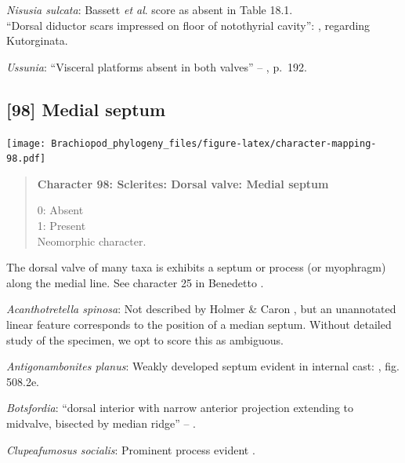 \documentclass[openany]{book}
\begin{document}
\hypertarget{Nisusia_sulcata-coding-97}{}
\emph{Nisusia sulcata}: Bassett \emph{et al}.
\citeyearpar{Bassett2001Functionalmorphology} score as absent in Table
18.1.\\
``Dorsal diductor scars impressed on floor of notothyrial cavity'':
\citet{Williams2000LinguliformeaCraniiformea}, regarding Kutorginata.

\hypertarget{Ussunia-coding-97}{}
\emph{Ussunia}: ``Visceral platforms absent in both valves'' --
\citet{Williams2000LinguliformeaCraniiformea}, p.~192.

\subsection*{{[}98{]} Medial septum}\label{medial-septum}

\texttt{[image: Brachiopod\_phylogeny\_files/figure-latex/character-mapping-98.pdf]}

\begin{quote}
\textbf{Character 98: Sclerites: Dorsal valve: Medial septum}

0: Absent\\
1: Present\\
Neomorphic character.
\end{quote}

The dorsal valve of many taxa is exhibits a septum or process (or
myophragm) along the medial line. See character 25 in Benedetto
\citeyearpar{Benedetto2009iChaniella}.

\hypertarget{Acanthotretella_spinosa-coding-98}{}
\emph{Acanthotretella spinosa}: Not described by Holmer \& Caron
\citeyearpar{Holmer2006Aspinose}, but an unannotated linear feature
corresponds to the position of a median septum. Without detailed study
of the specimen, we opt to score this as ambiguous.

\hypertarget{Antigonambonites_planus-coding-98}{}
\emph{Antigonambonites planus}: Weakly developed septum evident in
internal cast: \citet{Williams2000LinguliformeaCraniiformea}, fig.
508.2e.

\hypertarget{Botsfordia-coding-98}{}
\emph{Botsfordia}: ``dorsal interior with narrow anterior projection
extending to midvalve, bisected by median ridge'' --
\citet{Williams2000LinguliformeaCraniiformea}.

\hypertarget{Clupeafumosus_socialis-coding-98}{}
\emph{Clupeafumosus socialis}: Prominent process evident
\citep{Topper2013Reappraisalof}.
\end{document}
